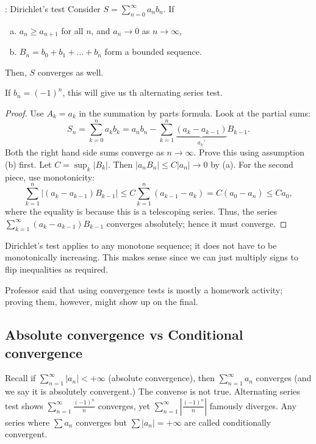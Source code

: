 \begin{ntheorem}{: Dirichlet's test}
	Consider \(S=\displaystyle\sum_{n=0}^{\infty}a_nb_n\). If 
	\begin{enumerate}[(a)]
		\item \(a_n\geq a_{n+1}\) for all \(n\), and \(a_n\to 0\) as \(n\to\infty\),
		
		\item \(B_n=b_0+b_1+\dots+b_n\) form a bounded sequence.
	\end{enumerate}
	Then, \(S\) converges as well.
\end{ntheorem}
\begin{note}
	If \(b_n=(-1)^n\), this will give us th alternating series test.
\end{note}
\begin{proof}
	Use \(A_k=a_k\) in the summation by parts formula. Look at the partial sums:
	\begin{equation*}
		S_n=\sum_{k=0}^na_kb_k=a_nb_n-\sum_{k=1}^n\underbrace{(a_k-a_{k-1})}_{a_k'}B_{k-1}.
	\end{equation*}
	Both the right hand side sums converge as \(n\to\infty\). Prove this using assumption (b) first. Let \(C=\sup_k|B_k|\). Then \(|a_nB_n|\leq C|a_n|\to 0\) by (a). For the second piece, use monotonicity:
	\begin{equation*}
		\sum_{k=1}^n|(a_k-a_{k-1})B_{k-1}|\leq C\sum_{k=1}^n(a_{k-1}-a_k)=C(a_0-a_n)\leq Ca_0,
	\end{equation*}
	where the equality is because this is a telescoping series. Thus, the series \(\displaystyle\sum_{k=1}^{\infty}(a_k-a_{k-1})B_{k-1}\) converges absolutely; hence it must converge.
\end{proof}
\begin{note}
	Dirichlet's test applies to any monotone sequence; it does not have to be monotonically increasing. This makes sense since we can just multiply signs to flip inequalities as required.
\end{note}
\begin{note}
	Professor said that using convergence tests is mostly a homework activity; proving them, however, might show up on the final.
\end{note}

\subsection{Absolute convergence vs Conditional convergence}
Recall if \(\displaystyle\sum_{n=1}^{\infty}|a_n|<+\infty\) (absolute convergence), then \(\displaystyle\sum_{n=1}^{\infty}a_n\) converges (and we say it is absolutely convergent.) The converse is not true. Alternating series test shows \(\displaystyle\sum_{n=1}^{\infty}\displaystyle\frac{(-1)^n}{n}\) converges, yet \(\displaystyle\sum_{n=1}^{\infty}\left|\frac{(-1)^n}{n}\right|\) famously diverges. Any series where \(\displaystyle\sum a_n\) converges but \(\displaystyle\sum |a_n|=+\infty\) are called conditionally convergent. 

